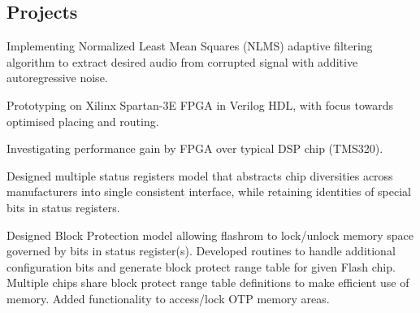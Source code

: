 \documentclass[]{deedy}
\begin{document}
\begin{minipage}[t]{0.72\textwidth}
\begin{flushleft}
%
\section{Projects}
%
\begin{tightemize}
\item Implementing Normalized Least Mean Squares (NLMS) adaptive filtering algorithm to extract desired audio from corrupted signal with additive autoregressive noise.
\item Prototyping on Xilinx Spartan-3E FPGA in Verilog HDL, with focus towards optimised placing and routing.
\item Investigating performance gain by FPGA over typical DSP chip (TMS320).
\end{tightemize}
\sectionsep
%
\begin{tightemize}
\item Designed multiple status registers model that abstracts chip diversities across manufacturers into single consistent interface, while retaining identities of special bits in status registers.
\item Designed Block Protection model allowing flashrom to lock/unlock memory space governed by bits in status register(s). Developed routines to handle additional configuration bits and generate block protect range table for given Flash chip. Multiple chips share block protect range table definitions to make efficient use of memory. Added functionality to access/lock OTP memory areas.

\end{tightemize}
\end{flushleft}
\end{minipage}
\end{document}
